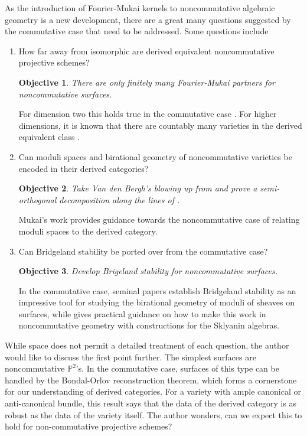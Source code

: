 \documentclass[11pt]{article}
\newtheorem{objective}{Objective}
\begin{document}
As the introduction of Fourier-Mukai kernels to noncommutative algebraic geometry is a new development, there are a great many questions suggested by the commutative case that need to be addressed.
Some questions include
\begin{enumerate}
\item
  How far away from isomorphic are derived equivalent noncommutative projective schemes?
  \begin{tcolorbox}
    \begin{objective}
      There are only finitely many Fourier-Mukai partners for noncommutative surfaces.
    \end{objective}
  \end{tcolorbox}
  For dimension two this holds true in the commutative case \cite[Sect. 12]{HuyFMT}.
  For higher dimensions, it is known that there are countably many varieties in the derived equivalent class \cite{AnToe}.
\item
  Can moduli spaces and birational geometry of noncommutative varieties be encoded in their derived categories?
  \begin{tcolorbox}
    \begin{objective}
      Take Van den Bergh's blowing up from \cite{van2001blowing} and prove a semi-orthogonal decomposition along the lines of \cite{Bondal-Orlov}.
    \end{objective}
  \end{tcolorbox}
  Mukai's work \cite{Mukai81,Mukai87} provides guidance towards the noncommutative case of relating moduli spaces to the derived category.
\item
  Can Bridgeland stability be ported over from the commutative case?
  \begin{tcolorbox}
    \begin{objective}
      Develop Brigeland stability for noncommutative surfaces.
    \end{objective}
  \end{tcolorbox}
  In the commutative case, seminal papers \cite{Bri07, ABCH13, BM14a, BM14b} establish Bridgeland stability as an impressive tool for studying the birational geometry of moduli of sheaves on surfaces, while \cite{LiZhMMP} gives practical guidance on how to make this work in noncommutative geometry with constructions for the Sklyanin algebras.
\end{enumerate}
While space does not permit a detailed treatment of each question, the author would like to discuss the first point further.
The simplest surfaces are noncommutative $\mathbb{P}^2$'s.
In the commutative case, surfaces of this type can be handled by the Bondal-Orlov reconstruction theorem, which forms a cornerstone for our understanding of derived categories.
For a variety with ample canonical or anti-canonical bundle, this result says that the data of the derived category is as robust as the data of the variety itself.
The author wonders, can we expect this to hold for non-commutative projective schemes?
\end{document}
